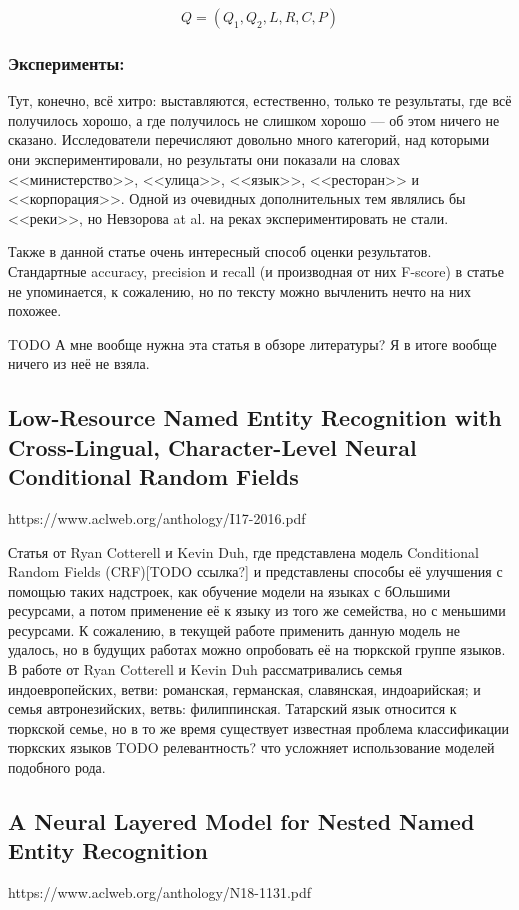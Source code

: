 \[Q = (Q_1, Q_2, L, R, C, P)\]

\subsubsection{Эксперименты:}

Тут, конечно, всё хитро: выставляются, естественно, только те результаты, где всё получилось хорошо, а где получилось не слишком хорошо --- об этом ничего не сказано. Исследователи перечисляют довольно много категорий, над которыми они экспериментировали, но результаты они показали на словах <<министерство>>, <<улица>>, <<язык>>, <<ресторан>> и <<корпорация>>. Одной из очевидных дополнительных тем являлись бы <<реки>>, но Невзорова at al. на реках экспериментировать не стали.

Также в данной статье очень интересный способ оценки результатов. Стандартные accuracy, precision и recall (и производная от них F-score) в статье не упоминается, к сожалению, но по тексту можно вычленить нечто на них похожее. 

TODO А мне вообще нужна эта статья в обзоре литературы? Я в итоге вообще ничего из неё не взяла.

\subsection{Low-Resource Named Entity Recognition with Cross-Lingual, Character-Level Neural Conditional Random Fields}

https://www.aclweb.org/anthology/I17-2016.pdf

Статья от Ryan Cotterell и Kevin Duh, где представлена модель Conditional Random Fields (CRF)[TODO ссылка?] и представлены способы её улучшения с помощью таких надстроек, как обучение модели на языках с бОльшими ресурсами, а потом применение её к языку из того же семейства, но с меньшими ресурсами. К сожалению, в текущей работе применить данную модель не удалось, но в будущих работах можно опробовать её на тюркской группе языков. В работе от Ryan Cotterell и Kevin Duh рассматривались семья индоевропейских, ветви: романская, германская, славянская, индоарийская; и семья автронезийских, ветвь: филиппинская. Татарский язык относится к тюркской семье, но в то же время существует известная проблема классификации тюркских языков 
TODO релевантность?
что усложняет использование моделей подобного рода.

\subsection{A Neural Layered Model for Nested Named Entity Recognition}
https://www.aclweb.org/anthology/N18-1131.pdf

